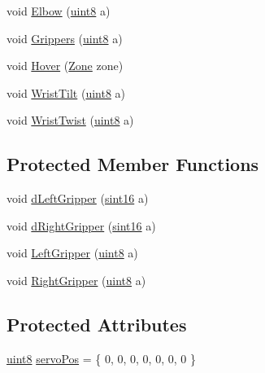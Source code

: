 \begin{DoxyCompactItemize}
void \hyperlink{classChipChipArray_1_1Arm_ac45149e03abfac230b75156bb42e8417}{Elbow} (\hyperlink{definitions_8hpp_adde6aaee8457bee49c2a92621fe22b79}{uint8} a)
\item 
void \hyperlink{classChipChipArray_1_1Arm_afe581f2e6c85ba07729d3ffe90fee9cd}{Grippers} (\hyperlink{definitions_8hpp_adde6aaee8457bee49c2a92621fe22b79}{uint8} a)
\item 
void \hyperlink{classChipChipArray_1_1Arm_a8871580fd6a75fd60d99300f2b5c21d1}{Hover} (\hyperlink{definitions_8hpp_adbd1e7a33d3e1751c7b2aa2562d0ecb9}{Zone} zone)
\item 
void \hyperlink{classChipChipArray_1_1Arm_ad61f7c1e63eb09981b6c304bd924e217}{Wrist\+Tilt} (\hyperlink{definitions_8hpp_adde6aaee8457bee49c2a92621fe22b79}{uint8} a)
\item 
void \hyperlink{classChipChipArray_1_1Arm_a35ec7756840d9d32dcfbb88d831f087f}{Wrist\+Twist} (\hyperlink{definitions_8hpp_adde6aaee8457bee49c2a92621fe22b79}{uint8} a)
\end{DoxyCompactItemize}
\subsection*{Protected Member Functions}
\begin{DoxyCompactItemize}
\item 
void \hyperlink{classChipChipArray_1_1Arm_a6da0950c7e3bd4a31264e562916c032d}{d\+Left\+Gripper} (\hyperlink{definitions_8hpp_a74df79fde3c518e55b29ce6360a9c76e}{sint16} a)
\item 
void \hyperlink{classChipChipArray_1_1Arm_adfa7cc779b7ec3bf8453277796c142ed}{d\+Right\+Gripper} (\hyperlink{definitions_8hpp_a74df79fde3c518e55b29ce6360a9c76e}{sint16} a)
\item 
void \hyperlink{classChipChipArray_1_1Arm_a776eade3a7aaa6effaabad7f37c71031}{Left\+Gripper} (\hyperlink{definitions_8hpp_adde6aaee8457bee49c2a92621fe22b79}{uint8} a)
\item 
void \hyperlink{classChipChipArray_1_1Arm_a46a0b0cfb37cb0b663c91cd07e440e10}{Right\+Gripper} (\hyperlink{definitions_8hpp_adde6aaee8457bee49c2a92621fe22b79}{uint8} a)
\end{DoxyCompactItemize}
\subsection*{Protected Attributes}
\begin{DoxyCompactItemize}
\item 
\hyperlink{definitions_8hpp_adde6aaee8457bee49c2a92621fe22b79}{uint8} \hyperlink{classChipChipArray_1_1Arm_abe425c250c1929e9c9c86e6ea9eeeb04}{servo\+Pos} = \{ 0, 0, 0, 0, 0, 0, 0 \}
\end{DoxyCompactItemize}


